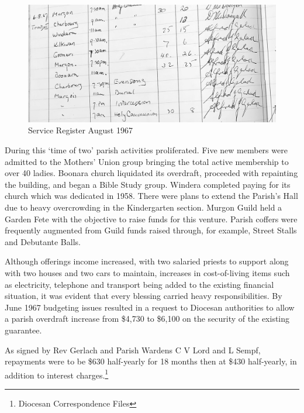 \begin{figure}[!htb]
\begin{center}
\includegraphics[width=1.\textwidth,center]{../images/serviceRegisterAug1967.jpg}
\caption{Service Register August 1967}
\end{center}
\end{figure}




During this `time of two' parish activities proliferated. Five new members were admitted to the Mothers' Union group bringing the total active membership to over 40 ladies. Boonara church liquidated its overdraft, proceeded with repainting the building, and began a Bible Study group. Windera completed paying for its church which was dedicated in 1958. There were plans to extend the Parish's Hall due to heavy overcrowding in the Kindergarten section. Murgon Guild held a Garden Fete with the objective to raise funds for this venture. Parish coffers were frequently augmented from Guild funds raised through, for example, Street Stalls and Debutante Balls.



Although offerings income increased, with two salaried priests to support along with two houses and two cars to maintain, increases in cost-of-living items such as electricity, telephone and transport being added to the existing financial situation, it was evident that every blessing carried heavy responsibilities. By June 1967 budgeting issues resulted in a request to Diocesan authorities to allow a parish overdraft increase from \$4,730 to \$6,100 on the security of the existing guarantee.



As signed by Rev Gerlach and Parish Wardens C V Lord and L Sempf, repayments were to be \$630 half-yearly for 18 months then at \$430 half-yearly, in addition to interest charges.\footnote{Diocesan Correspondence Files}


